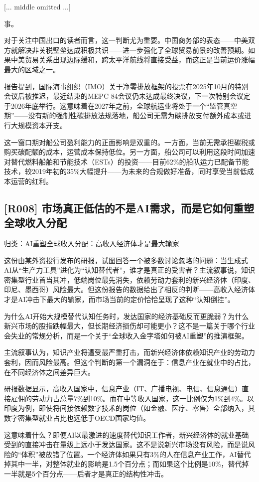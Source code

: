 \documentclass[11pt]{ctexart}
\begin{document}
[... middle omitted ...]

事。

对于关注中国出口的读者而言，这一判断尤为重要。中国商务部的表态——中美双方就解决非关税壁垒达成积极共识——进一步强化了全球贸易前景的改善预期。如果中美贸易关系出现边际缓和，跨太平洋航线将直接受益，而这正是当前运价涨幅最大的区域之一。

报告提到，国际海事组织（IMO）关于净零排放框架的投票在2025年10月的特别会议后被推迟，最近结束的MEPC 84会议仍未达成最终决议，下一次特别会议定于2026年底举行。这意味着在2027年之前，全球航运业将处于一个“监管真空期”——没有新的强制性碳排放法规落地，船公司无需为碳排放支付额外成本或进行大规模资本开支。

这一窗口期对船公司盈利能力的正面影响是双重的。一方面，当前无需承担碳税或购买碳配额的成本，运营成本保持低位。另一方面，船公司可以利用这段时间加速对替代燃料船舶和节能技术（ESTs）的投资——目前62\%的船队运力已配备节能技术，较2019年初的35\%大幅提升——为未来的合规做好准备，同时享受当前低成本运营的红利。

\subsection{[R008] 市场真正低估的不是AI需求，而是它如何重塑全球收入分配}
{\small\color{refgray}归类：AI重塑全球收入分配：高收入经济体才是最大输家}

这份由某外资投行发布的研报，试图回答一个被多数讨论忽略的问题：当生成式AI从“生产力工具”进化为“认知替代者”，谁才是真正的受害者？主流叙事说，知识密集型行业首当其冲，低端岗位最先消失，依赖劳动力套利的新兴经济体（印度、印尼、墨西哥）风险最大。但这份报告的数据给出了相反的判断——高收入经济体才是AI冲击下最大的输家，而市场当前的定价恰恰呈现了这种“认知倒挂”。

为什么AI开始大规模替代认知任务时，发达国家的经济基础反而更脆弱？为什么新兴市场的股指跌幅最大，但长期经济损伤却可能更小？这不是一篇关于哪个行业会失业的常规分析，而是一个关于“全球收入金字塔如何被AI重塑”的推演框架。

主流叙事认为，知识产业将遭受最严重打击，而新兴经济体依赖知识产业的劳动力套利，因而风险最高。但这个判断的第一个漏洞在于：信息产业在就业中的占比，在不同经济体之间差异巨大。

研报数据显示，高收入国家中，信息产业（IT、广播电视、电信、信息通信）直接雇佣的劳动力占总量7\%到10\%。而在中等收入国家，这一比例仅为1\%到4\%。以印度为例，即使将间接依赖数字技术的岗位（如金融、医疗、零售）全部纳入，其数字密集型就业占比也远低于OECD国家均值。

这意味着什么？即便AI以最激进的速度替代知识工作者，新兴经济体的就业基础受到的直接冲击在量级上远小于发达国家。这不是说新兴市场没有风险，而是说风险的“体积”被放错了位置。一个经济体如果只有3\%的人在信息产业工作，AI替代掉其中一半，对整体就业的影响是1.5个百分点；而如果这个比例是10\%，替代掉一半就是5个百分点——后者才是真正的结构性冲击。
\end{document}

